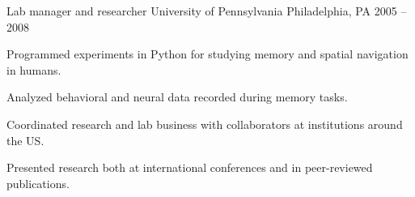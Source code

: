 \begin{cventries}
  \cventry
    {Lab manager and researcher} %
    {University of Pennsylvania} %
    {Philadelphia, PA} %
    {2005 -- 2008} %
    {
      \begin{cvitems} %
        \item {Programmed experiments in Python for studying memory and spatial navigation in humans.}
        \item {Analyzed behavioral and neural data recorded during memory tasks.}
        \item {Coordinated research and lab business with collaborators at institutions around the US.}
        \item {Presented research both at international conferences and in peer-reviewed publications.}
      \end{cvitems}
    }


\end{cventries}
